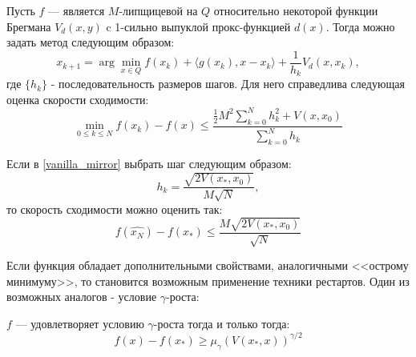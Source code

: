     \begin{theorem} \label{vanilla_mirror}
        Пусть $f$ --- является $M$-липщицевой на $Q$ относительно некоторой функции Брегмана $V_d(x, y)$ c 1-сильно выпуклой прокс-функцией $d(x)$. Тогда можно задать метод следующим образом:
        \begin{equation} \label{mirr_upd}
            x_{k+1} = \arg \min_{x \in Q} {f(x_k) + \langle g(x_k), x - x_k \rangle + \frac{1}{h_k} V_d(x, x_k)},
        \end{equation}
        где $\{ h_k \}$ - последовательность размеров шагов.
        Для него справедлива следующая оценка скорости сходимости:
        \begin{equation} \label{general_est}
            \min_{0\leq k \leq N} f(x_k) - f(x) \leq \frac{\frac{1}{2} M^2 \sum_{k=0}^N h_k^2 + V(x, x_0)}{\sum_{k=0}^N h_k}
        \end{equation}
    \end{theorem}


    \begin{remark}
        Если в \ref{vanilla_mirror} выбрать шаг следующим образом:
        \begin{equation} \label{mirr_step}
            h_{k} = \frac{\sqrt{2 V(x_*, x_0)}}{M\sqrt{N}},
        \end{equation}
        то скорость сходимости можно оценить так:
        \begin{equation} \label{mirr_est}
            f(\widehat{x_N}) - f(x_*) \leq \frac{M\sqrt{2V(x_*, x_0)}}{\sqrt{N}}
        \end{equation}
    \end{remark}
    Если функция обладает дополнительными свойствами, аналогичными <<острому минимуму>>,  то становится возможным применение техники рестартов. Один из возможных аналогов - условие $\gamma$-роста:

    \begin{definition} \label{gamma-growth}
       $f$ --- удовлетворяет условию $\gamma$-роста тогда и только тогда:
       \begin{equation}
           f(x) - f(x_*) \geq \mu_{\gamma}(V(x_*,x))^{\gamma/2}
       \end{equation}
    \end{definition}

